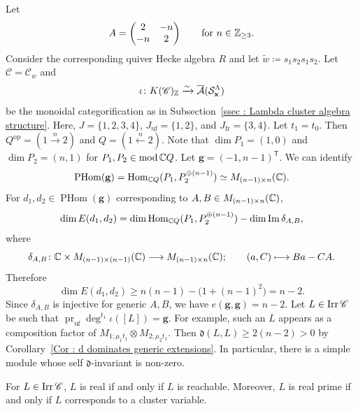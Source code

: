 \begin{Ex}
\label{Ex : positive self d invariant}
Let
\[
A = \begin{pmatrix}2 & -n \\ -n & 2\end{pmatrix}
\qquad\text{for }n \in \mathbb{Z}_{\geq 3}.
\]
Consider the corresponding quiver Hecke algebra $R$ and let
$\widetilde{w} \coloneq s_1s_2s_1s_2$.
Let $\mathscr{C} = \mathscr{C}_w$ and
\[
\iota \colon K(\mathscr{C})_{\mathbb{Z}}
\xrightarrow{\sim}
\overline{\mathcal{A}}(\mathcal{S}_{\mathbf{x}}^{\Lambda})
\]
be the monoidal categorification as in
Subsection~\ref{ssec : Lambda cluster algebra structure}.
Here, $J = \{1, 2, 3, 4\}$, $J_{\mathrm{uf}} = \{1, 2\}$,
and $J_{\mathrm{fr}} = \{3, 4\}$.
Let $t_1 = t_0$.
Then $Q^{\mathrm{op}} = (1 \xrightarrow{n} 2)$
and $Q = (1 \xleftarrow{n} 2)$.
Note that $\dim P_1 = (1, 0)$ and $\dim P_2 = (n, 1)$
for $P_1, P_2 \in \operatorname{mod}\mathbb{C} Q$.
Let $\mathbf{g} = (-1, n-1)^{\mathsf{T}}$.
We can identify
\[
\operatorname{PHom}(\mathbf{g})
= \operatorname{Hom}_{\mathbb{C} Q}(P_1, P_2^{\oplus(n-1)})
\simeq M_{(n-1)\times n}(\mathbb{C}).
\]
For $d_1, d_2 \in \operatorname{PHom}(\mathbf{g})$
corresponding to $A, B \in M_{(n-1)\times n}(\mathbb{C})$,
\[
\dim E(d_1, d_2)
= \dim\operatorname{Hom}_{\mathbb{C} Q}(P_1, P_2^{\oplus(n-1)})
- \dim\operatorname{Im}\delta_{A,B},
\]
where
\[
\delta_{A,B} \colon
\mathbb{C} \times M_{(n-1)\times(n-1)}(\mathbb{C})
\longrightarrow M_{(n-1)\times n}(\mathbb{C});
\qquad (a, C) \longmapsto Ba - CA.
\]
Therefore
\[
\dim E(d_1, d_2)
\geq n(n-1)-\bigl(1+(n-1)^2\bigr)
= n-2.
\]
Since $\delta_{A,B}$ is injective for generic $A, B$, we have
$e(\mathbf{g}, \mathbf{g}) = n-2$.
Let $L \in \mathop{\mathrm{Irr}}\nolimits\mathscr{C}$ be such that
$\operatorname{pr}_{\mathrm{uf}}\deg^{t_1}\iota([L]) = \mathbf{g}$.
For example, such an $L$ appears as a composition factor of
$M_{1;\mu_1t_1} \otimes M_{2;\mu_2t_1}$.
Then $\mathfrak{d}(L, L) \geq 2(n-2) > 0$
by Corollary~\ref{Cor : d dominates generic extensions}.
In particular, there is a simple module whose self $\mathfrak{d}$-invariant
is non-zero.
\end{Ex}

\begin{Thm}
\label{Thm : monoidal reachability for acyclic cluster algebras}
For $L \in \mathop{\mathrm{Irr}}\nolimits\mathscr{C}$,
$L$ is real if and only if $L$ is reachable.
Moreover, $L$ is real prime if and only if
$L$ corresponds to a cluster variable.
\end{Thm}


